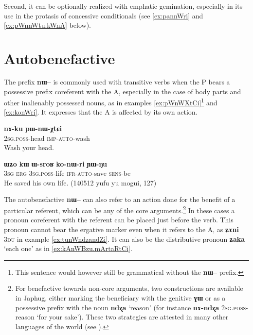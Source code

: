 \documentclass[oldfontcommands,oneside,a4paper,11pt]{article}
\newcommand{\ipa}[1]{\textbf{{\phon\mbox{#1}}}} %
\begin{document}
Second, it can be optionally realized with emphatic gemination, especially in its use in the protasis of concessive conditionals (see \ref{ex:pannWri} and \ref{ex:pWnnWtu.kWnA}  below).


\section{Autobenefactive}

The prefix \ipa{nɯ--}  is commonly used with transitive verbs when the P bears a possessive prefix coreferent with the A, especially in the case of body parts and other inalienably possessed nouns, as in examples \ref{ex:pWnWXtCi}\footnote{This sentence would however still be grammatical without the \ipa{nɯ--} prefix.} and \ref{ex:konWri}. It expresses that the A is affected by its own action.

\begin{exe}
\ex \label{ex:pWnWXtCi}
\gll 
\ipa{nɤ-ku} 	\ipa{pɯ-nɯ-χtɕi} \\
\textsc{2sg.poss}-head \textsc{imp-auto}-wash \\
\glt Wash your head.
\end{exe}

\begin{exe}
\ex \label{ex:konWri}
\gll 
\ipa{ɯʑo} 	\ipa{kɯ} 	\ipa{ɯ-sroʁ} 	\ipa{ko-nɯ-ri} 	\ipa{ɲɯ-ŋu} \\
\textsc{3sg} \textsc{erg} \textsc{3sg.poss}-life \textsc{ifr-auto}-save \textsc{sens}-be \\
\glt He saved his own life. (140512 yufu yu mogui, 127)
\end{exe}

The autobenefactive \ipa{nɯ--} can also refer to an action done for the benefit of a particular referent, which can be any of the core arguments.\footnote{For benefactive towards non-core arguments, two constructions are available in Japhug, either marking the beneficiary with the genitive \ipa{ɣɯ} or as a possessive prefix with the noun \ipa{ndʐa} `reason' (for instance \ipa{nɤ-ndʐa} \textsc{2sg.poss}-reason `for your sake'). These two strategies are attested in many other languages of the world (see \citealt[7-10]{zuniga10benefactive}).} In these cases a pronoun coreferent with the referent can be placed just before the verb. This pronoun cannot bear the ergative marker even when it refers to the A, as \ipa{ʑɤni} \textsc{3du} in example \ref{ex:tunWndzandZi}. It can also be the distributive pronoun \ipa{ʑaka} `each one' as in \ref{ex:kAnWBzu.mArtaRtCi}.
\end{document}
